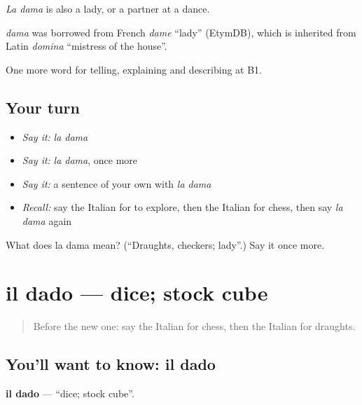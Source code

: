 \emph{La dama} is also a lady, or a partner at a dance.

\begin{cousinweb}
\emph{dama} was borrowed from French \emph{dame} \textquotedblleft{}lady\textquotedblright{} (EtymDB), which is inherited from Latin \emph{domina} \textquotedblleft{}mistress of the house\textquotedblright{}.
\end{cousinweb}

\begin{grammarlens}[title={What you've built}]
One more word for telling, explaining and describing at B1.
\end{grammarlens}

\subsection*{Your turn}
\begin{itemize}
\raggedright
  \item \emph{Say it:} \emph{la dama}
  \item \emph{Say it:} \emph{la dama}, once more
  \item \emph{Say it:} a sentence of your own with \emph{la dama}
  \item \emph{Recall:} say the Italian for to explore, then the Italian for chess, then say \emph{la dama} again
\end{itemize}

\begin{tcolorbox}[breakable,colback=teal!4,colframe=teal!35!black,title={Before you move on}]
What does la dama mean? (\textquotedblleft{}Draughts, checkers; lady\textquotedblright{}.) Say it once more.
\end{tcolorbox}
\section[il dado]{il dado — dice; stock cube}

\label{lesson:IT-C503-dado}



\begin{quote}
Before the new one: say the Italian for chess, then the Italian for draughts.
\end{quote}

\subsection*{You'll want to know: il dado}
\textbf{il dado} — \textquotedblleft{}dice; stock cube\textquotedblright{}.

